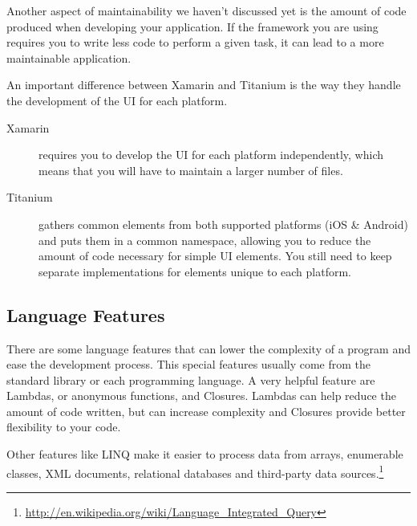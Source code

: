 Another aspect of maintainability we haven't discussed yet is the amount of code produced when developing your application. If the framework you are using requires you to write less code to perform a given task, it can lead to a more maintainable application.

An important difference between Xamarin and Titanium is the way they handle the development of the \ac{UI} for each platform.

\begin{description}
\item[Xamarin] requires you to develop the \ac{UI} for each platform independently, which means that you will have to maintain a larger number of files.
\item[Titanium] gathers common elements from both supported platforms (iOS \& Android) and puts them in a common namespace, allowing you to reduce the amount of code necessary for simple \ac{UI} elements. You still need to keep separate implementations for elements unique to each platform.
\end{description}
\vfill


\subsection{Language Features}

There are some language features that can lower the complexity of a program and ease the development process. This special features usually come from the standard library or each programming language. A very helpful feature are Lambdas, or anonymous functions, and Closures. Lambdas can help reduce the amount of code written, but can increase complexity and Closures provide better flexibility to your code.

Other features like \ac{LINQ} make it easier to process data from arrays, enumerable classes, XML documents, relational databases and third-party data sources.\footnote{\url{http://en.wikipedia.org/wiki/Language_Integrated_Query}} 


